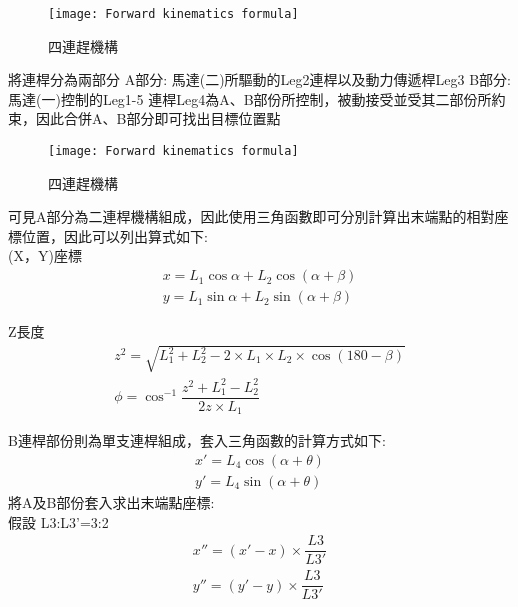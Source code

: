 \begin{figure}[hbt!]
\begin{center}
\texttt{[image: Forward kinematics formula]}
\caption{\Large 四連趕機構}\label{Forward kinematics formula}
\end{center}
\end{figure}

將連桿分為兩部分
A部分: 馬達(二)所驅動的Leg2連桿以及動力傳遞桿Leg3
B部分:馬達(一)控制的Leg1-5
連桿Leg4為A、B部份所控制，被動接受並受其二部份所約束，因此合併A、B部分即可找出目標位置點

\begin{figure}[hbt!]
\begin{center}
\texttt{[image: Forward kinematics formula]}
\caption{\Large 四連趕機構}\label{Forward kinematics formula}
\end{center}
\end{figure}

可見A部分為二連桿機構組成，因此使用三角函數即可分別計算出末端點的相對座標位置，因此可以列出算式如下:\\

(X，Y)座標    
\[
\begin{aligned}
x=L_{1}\cos \alpha +L_{2}\cos \left( \alpha +\beta \right)\\
y=L_{1}\sin \alpha +L_{2}\sin \left( \alpha +\beta \right) 
\end{aligned}
\]

Z長度
\[
\begin{aligned}
z^{2}=\sqrt{L_{1}^{2}+L_{2}^{2}-2\times L_{1}\times L_{2}\times \cos \left( 180-\beta \right) }\\
\phi =\cos ^{-1}\dfrac{z^{2}+L_{1}^{2}-L_{2}^{2}}{2z\times L_{1}}
\end{aligned}
\]

B連桿部份則為單支連桿組成，套入三角函數的計算方式如下:\\

\[
\begin{aligned}
x'=L_{4}\cos \left( \alpha +\theta \right)\\
y'=L_{4}\sin \left( \alpha +\theta \right)
\end{aligned}
\]
將A及B部份套入求出末端點座標:\\

假設
L3:L3'=3:2
\[
\begin{aligned}
x''=\left( x'-x\right) \times \dfrac{L3}{L3'}\\
y''=\left( y'-y\right) \times \dfrac{L3}{L3'}
\end{aligned}
\]

